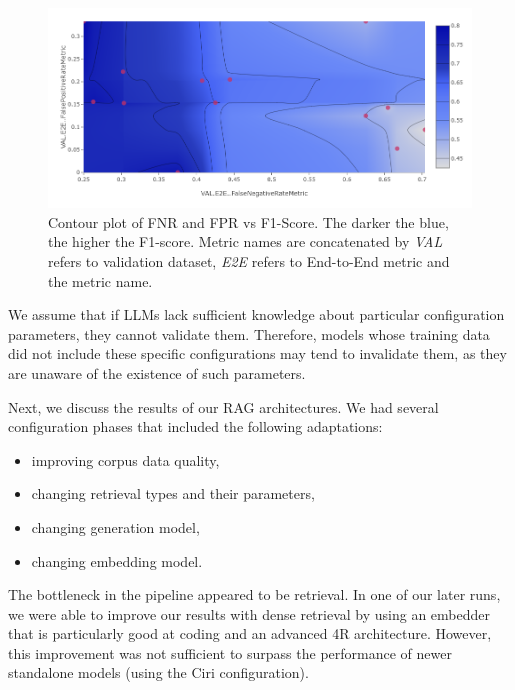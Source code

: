 \begin{figure}[!ht]
    \centering
    \includegraphics[width=\textwidth]{images/FNR-FPR-F1.png}
    \caption{Contour plot of FNR and FPR vs F1-Score. The darker the blue, the higher the F1-score. Metric names are concatenated by \textit{VAL} refers to validation dataset, \textit{E2E} refers to End-to-End metric and the metric name.}
    \label{fig:fnrfpr}
\end{figure}

We assume that if LLMs lack sufficient knowledge about particular configuration parameters, they cannot validate them. Therefore, models whose training data did not include these specific configurations may tend to invalidate them, as they are unaware of the existence of such parameters.

Next, we discuss the results of our RAG architectures. We had several configuration phases that included the following adaptations:
\begin{itemize}
    \item improving corpus data quality,
    \item changing retrieval types and their parameters,
    \item changing generation model,
    \item changing embedding model.
\end{itemize}

The bottleneck in the pipeline appeared to be retrieval. In one of our later runs, we were able to improve our results with dense retrieval by using an embedder that is particularly good at coding and an advanced 4R architecture. However, this improvement was not sufficient to surpass the performance of newer standalone models (using the Ciri configuration).

